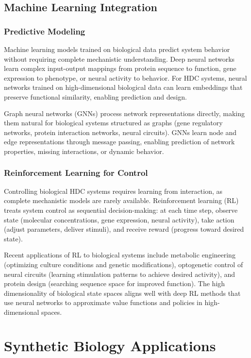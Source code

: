 \documentclass[12pt]{article}
\begin{document}
\subsection{Machine Learning Integration}

\subsubsection{Predictive Modeling}

Machine learning models trained on biological data predict system behavior without requiring complete mechanistic understanding. Deep neural networks learn complex input-output mappings from protein sequence to function, gene expression to phenotype, or neural activity to behavior. For HDC systems, neural networks trained on high-dimensional biological data can learn embeddings that preserve functional similarity, enabling prediction and design.

Graph neural networks (GNNs) process network representations directly, making them natural for biological systems structured as graphs (gene regulatory networks, protein interaction networks, neural circuits). GNNs learn node and edge representations through message passing, enabling prediction of network properties, missing interactions, or dynamic behavior.

\subsubsection{Reinforcement Learning for Control}

Controlling biological HDC systems requires learning from interaction, as complete mechanistic models are rarely available. Reinforcement learning (RL) treats system control as sequential decision-making: at each time step, observe state (molecular concentrations, gene expression, neural activity), take action (adjust parameters, deliver stimuli), and receive reward (progress toward desired state).

Recent applications of RL to biological systems include metabolic engineering (optimizing culture conditions and genetic modifications), optogenetic control of neural circuits (learning stimulation patterns to achieve desired activity), and protein design (searching sequence space for improved function). The high dimensionality of biological state spaces aligns well with deep RL methods that use neural networks to approximate value functions and policies in high-dimensional spaces.

\section{Synthetic Biology Applications}
\end{document}
